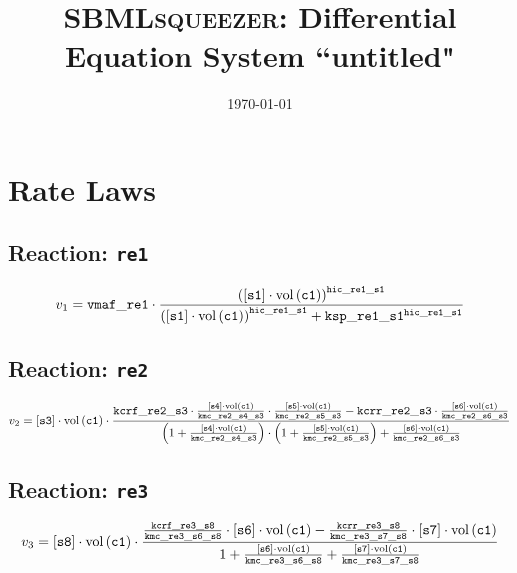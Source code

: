 \documentclass[11pt,a4paper]{scrartcl}
\title{\textsc{SBMLsqueezer}: Differential Equation System ``untitled"}
\date{\today}
\begin{document}
\author{}
\maketitle

\section{Rate Laws}
\subsection{Reaction: \texttt{re1}}

\begin{equation}
v_{1}=\mathtt{vmaf\-\_re1}\cdot \frac{\left([\mathtt{s1}]\cdot \mathrm{vol}\left(\mathtt{c1}\right)\right)^{\mathtt{hic\-\_re1\-\_s1}}}{\left([\mathtt{s1}]\cdot \mathrm{vol}\left(\mathtt{c1}\right)\right)^{\mathtt{hic\-\_re1\-\_s1}}+\mathtt{ksp\-\_re1\-\_s1}^{\mathtt{hic\-\_re1\-\_s1}}}
\end{equation}
\subsection{Reaction: \texttt{re2}}

\begin{equation}
v_{2}=[\mathtt{s3}]\cdot \mathrm{vol}\left(\mathtt{c1}\right)\cdot \frac{\mathtt{kcrf\-\_re2\-\_s3}\cdot \frac{[\mathtt{s4}]\cdot \mathrm{vol}\left(\mathtt{c1}\right)}{\mathtt{kmc\-\_re2\-\_s4\-\_s3}}\cdot \frac{[\mathtt{s5}]\cdot \mathrm{vol}\left(\mathtt{c1}\right)}{\mathtt{kmc\-\_re2\-\_s5\-\_s3}}-\mathtt{kcrr\-\_re2\-\_s3}\cdot \frac{[\mathtt{s6}]\cdot \mathrm{vol}\left(\mathtt{c1}\right)}{\mathtt{kmc\-\_re2\-\_s6\-\_s3}}}{\left(1+\frac{[\mathtt{s4}]\cdot \mathrm{vol}\left(\mathtt{c1}\right)}{\mathtt{kmc\-\_re2\-\_s4\-\_s3}}\right)\cdot\left(1+\frac{[\mathtt{s5}]\cdot \mathrm{vol}\left(\mathtt{c1}\right)}{\mathtt{kmc\-\_re2\-\_s5\-\_s3}}\right)+\frac{[\mathtt{s6}]\cdot \mathrm{vol}\left(\mathtt{c1}\right)}{\mathtt{kmc\-\_re2\-\_s6\-\_s3}}}
\end{equation}
\subsection{Reaction: \texttt{re3}}

\begin{equation}
v_{3}=[\mathtt{s8}]\cdot \mathrm{vol}\left(\mathtt{c1}\right)\cdot \frac{\frac{\mathtt{kcrf\-\_re3\-\_s8}}{\mathtt{kmc\-\_re3\-\_s6\-\_s8}}\cdot [\mathtt{s6}]\cdot \mathrm{vol}\left(\mathtt{c1}\right)-\frac{\mathtt{kcrr\-\_re3\-\_s8}}{\mathtt{kmc\-\_re3\-\_s7\-\_s8}}\cdot [\mathtt{s7}]\cdot \mathrm{vol}\left(\mathtt{c1}\right)}{1+\frac{[\mathtt{s6}]\cdot \mathrm{vol}\left(\mathtt{c1}\right)}{\mathtt{kmc\-\_re3\-\_s6\-\_s8}}+\frac{[\mathtt{s7}]\cdot \mathrm{vol}\left(\mathtt{c1}\right)}{\mathtt{kmc\-\_re3\-\_s7\-\_s8}}}
\end{equation}
\end{document}
